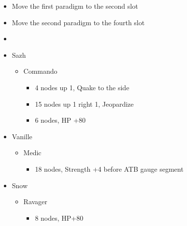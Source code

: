 \begin{menu}
  \begin{multicols}{2}
    \begin{itemize}
      \paradigm
      \begin{itemize}
        \item Move the first paradigm to the second slot
        \item Move the second paradigm to the fourth slot
        \item {}%
              {\paradigmline{(\syn)}{\sab}{\rav}}%
              {\paradigmline{\com}{\sab}{\com}}%
              {\paradigmline{\syn}{\med}{\com}}%
              {\paradigmline{\com}{\med}{\com}}%
              {\paradigmline[5]{\textit{\syn}}{\textit{\sab}}{\textit{\com}}}%
              {\paradigmline{\com}{\rav}{\com}}
      \end{itemize}
      \crystarium
      \begin{itemize}
        \item Sazh
              \begin{itemize}
                \item Commando
                      \begin{itemize}
                        \item 4 nodes up 1, Quake to the side
                        \item 15 nodes up 1 right 1, Jeopardize
                        \item 6 nodes, HP +80
                      \end{itemize}
              \end{itemize}
        \item Vanille
              \begin{itemize}
                \item Medic
                      \begin{itemize}
                        \item 18 nodes, Strength +4 before ATB gauge segment
                      \end{itemize}
              \end{itemize}
        \item Snow
              \begin{itemize}
                \item Ravager
                      \begin{itemize}
                        \item 8 nodes, HP+80

\end{itemize}
\end{itemize}
\end{itemize}
\end{itemize}
\end{multicols}
\end{menu}
